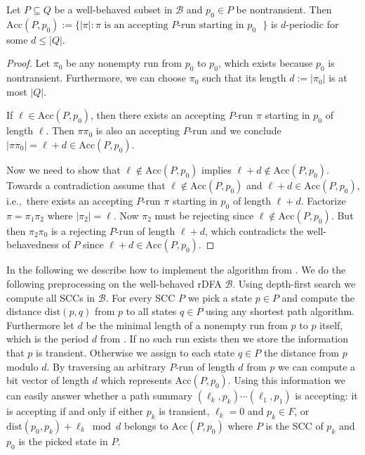 \documentclass{article}\usepackage[a4paper,margin=20mm]{geometry}
\newcommand{\B}{\mathcal{B}}
\renewcommand{\leq}{\leqslant}
\renewcommand{\le}{\leq}
\begin{document}
\begin{lemma}
	\label{lem:wb-period}
	Let $P \subseteq Q$ be a well-behaved subset in $\B$ and $p_0 \in P$ be nontransient.
	Then $\mathrm{Acc}(P,p_0) := \{ |\pi| : \pi \text{ is an accepting $P$-run starting in $p_0$ } \}$
	is $d$-periodic for some $d \le |Q|$.
\end{lemma}

\begin{proof}
	Let $\pi_0$ be any nonempty run from $p_0$ to $p_0$, which exists because $p_0$ is nontransient.
	Furthermore, we can choose $\pi_0$ such that its length $d := |\pi_0|$ is at most $|Q|$.
	
	If $\ell \in \mathrm{Acc}(P,p_0)$, then there exists an accepting $P$-run $\pi$ starting in $p_0$
	of length $\ell$.
	Then $\pi \pi_0$ is also an accepting $P$-run
	and we conclude $|\pi\pi_0| = \ell + d \in \mathrm{Acc}(P,p_0)$.

	Now we need to show that $\ell \notin \mathrm{Acc}(P,p_0)$ implies $\ell + d \notin \mathrm{Acc}(P,p_0)$.
	Towards a contradiction assume that $\ell \notin \mathrm{Acc}(P,p_0)$
	and $\ell + d \in \mathrm{Acc}(P,p_0)$,
	i.e.,~there exists an accepting $P$-run $\pi$ starting in $p_0$ of length $\ell+d$.
	Factorize $\pi = \pi_1 \pi_2$ where $|\pi_2| = \ell$.
	Now $\pi_2$ must be rejecting since $\ell \notin \mathrm{Acc}(P,p_0)$.
	But then $\pi_2 \pi_0$ is a rejecting $P$-run of length $\ell+d$,
	which contradicts the well-behavedness of $P$ since $\ell + d \in \mathrm{Acc}(P,p_0)$.
\end{proof}

In the following we describe how to implement the algorithm from .
We do the following preprocessing on the well-behaved rDFA $\B$.
Using depth-first search we compute all SCCs in $\B$.
For every SCC $P$ we pick a state $p \in P$ and compute the distance
$\mathrm{dist}(p,q)$ from $p$ to all states $q \in P$ using any shortest path algorithm.
Furthermore let $d$ be the minimal length of a nonempty run from $p$ to $p$ itself,
which is the period $d$ from .
If no such run exists then we store the information that $p$ is transient.
Otherwise we assign to each state $q \in P$ the distance from $p$ modulo $d$.
By traversing an arbitrary $P$-run of length $d$ from $p$ we can compute a bit vector of length $d$
which represents $\mathrm{Acc}(P,p_0)$.
Using this information we can easily answer whether a path summary $(\ell_k,p_k) \cdots (\ell_1,p_1)$ is accepting:
it is accepting if and only if
either $p_k$ is transient, $\ell_k = 0$ and $p_k \in F$,
or $\mathrm{dist}(p_0,p_k) + \ell_k \bmod d$ belongs to $\mathrm{Acc}(P,p_0)$
where $P$ is the SCC of $p_k$ and $p_0$ is the picked state in $P$.
\end{document}
